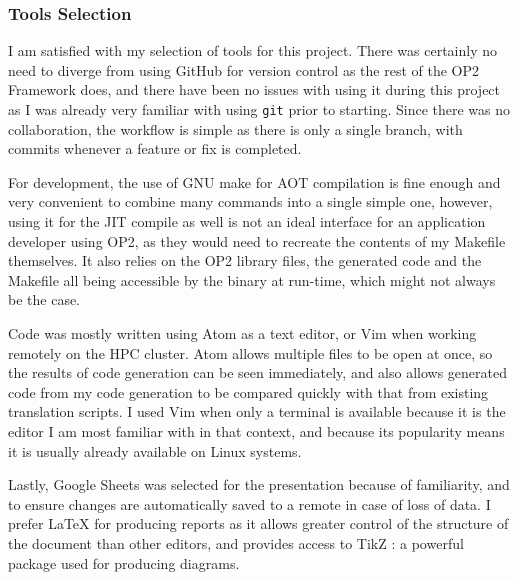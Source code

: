 \subsubsection{Tools Selection}
I am satisfied with my selection of tools for this project. There was certainly no need to diverge from using GitHub for version control as the rest of the OP2 Framework does, and there have been no issues with using it during this project as I was already very familiar with using \verb|git| prior to starting. Since there was no collaboration, the workflow is simple as there is only a single branch, with commits whenever a feature or fix is completed.
\par
For development, the use of GNU make for AOT compilation is fine enough and very convenient to combine many commands into a single simple one, however, using it for the JIT compile as well is not an ideal interface for an application developer using OP2, as they would need to recreate the contents of my Makefile themselves. It also relies on the OP2 library files, the generated code and the Makefile all being accessible by the binary at run-time, which might not always be the case.
\par
Code was mostly written using Atom \cite{atom} as a text editor, or Vim \cite{vim} when working remotely on the HPC cluster. Atom allows multiple files to be open at once, so the results of code generation can be seen immediately, and also allows generated code from my code generation to be compared quickly with that from existing translation scripts. I used Vim when only a terminal is available because it is the editor I am most familiar with in that context, and because its popularity means it is usually already available on Linux systems.
\par
Lastly, Google Sheets \cite{gsheets} was selected for the presentation because of familiarity, and to ensure changes are automatically saved to a remote in case of loss of data. I prefer LaTeX for producing reports as it allows greater control of the structure of the document than other editors, and provides access to TikZ \cite{tikz}: a powerful package used for producing diagrams.
